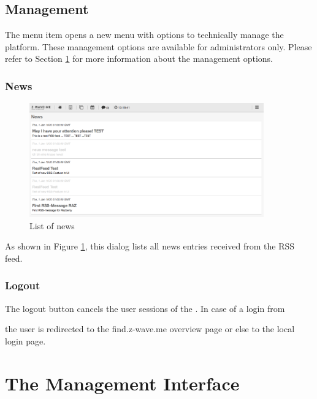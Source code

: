 \subsection{Management}

The menu item  opens a new menu with options to technically manage the platform. 
These management options are available for administrators only. Please refer to Section 
\ref{ManagementInterface} for more information about the management options.

\subsubsection{News}
\label{news}

\begin{figure}
\begin{center}
\includegraphics[width=0.9\textwidth]{pngs/cap4/news2.png}
\caption{List of \zway news}
\label{news2}
\end{center}
\end{figure}

As shown in Figure \ref{news2}, this dialog lists all news entries received from the RSS feed.

\subsubsection{Logout}

The logout button cancels the user sessions of the \zwshui. In case of 
a login from 



the user is redirected to the find.z-wave.me overview page or 
else to the local login page.

\section {The Management Interface}
\label{ManagementInterface}


